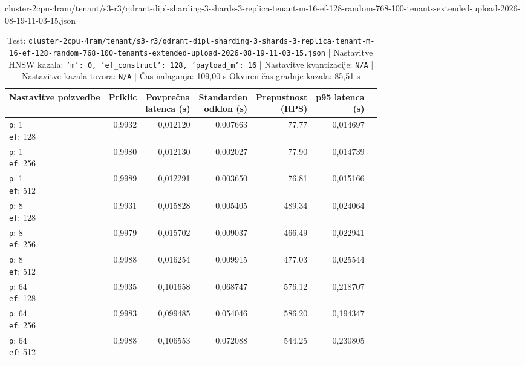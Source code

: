 \begin{table}[htbp]
  \centering
\small
  \caption{cluster-2cpu-4ram/tenant/s3-r3/qdrant-dipl-sharding-3-shards-3-replica-tenant-m-16-ef-128-random-768-100-tenants-extended-upload-2026-08-19-11-03-15.json}
  \label{tab:cluster-2cpu-4ram:tenant:s3-r3:qdrant-dipl-sharding-3-shards-3-replica-tenant-m-16-ef-128-random-768-100-tenants-extended-upload-2026-08-19-11-03-15.json}
  \begin{tabularx}{\textwidth}{Xrrrrrr}
    \toprule
    Nastavitve poizvedbe & Priklic & \makecell{Povprečna\\latenca (s)} & \makecell{Standarden\\odklon (s)} & \makecell{Prepustnost\\(RPS)} & \makecell{p95 latenca\\(s)}  \\
    \midrule
    \makecell{\texttt{p}: 1\\\texttt{ef}: 128} & 0,9932 & 0,012120 & 0,007663 & 77,77 & 0,014697 \\
    \makecell{\texttt{p}: 1\\\texttt{ef}: 256} & 0,9980 & 0,012130 & 0,002027 & 77,90 & 0,014739 \\
    \makecell{\texttt{p}: 1\\\texttt{ef}: 512} & 0,9989 & 0,012291 & 0,003650 & 76,81 & 0,015166 \\
    \makecell{\texttt{p}: 8\\\texttt{ef}: 128} & 0,9931 & 0,015828 & 0,005405 & 489,34 & 0,024064 \\
    \makecell{\texttt{p}: 8\\\texttt{ef}: 256} & 0,9979 & 0,015702 & 0,009037 & 466,49 & 0,022941 \\
    \makecell{\texttt{p}: 8\\\texttt{ef}: 512} & 0,9988 & 0,016254 & 0,009915 & 477,03 & 0,025544 \\
    \makecell{\texttt{p}: 64\\\texttt{ef}: 128} & 0,9935 & 0,101658 & 0,068747 & 576,12 & 0,218707 \\
    \makecell{\texttt{p}: 64\\\texttt{ef}: 256} & 0,9983 & 0,099485 & 0,054046 & 586,20 & 0,194347 \\
    \makecell{\texttt{p}: 64\\\texttt{ef}: 512} & 0,9988 & 0,106553 & 0,072088 & 544,25 & 0,230805 \\
    \bottomrule
  \end{tabularx}
\caption* {Test: \texttt{cluster-2cpu-4ram/tenant/s3-r3/qdrant-dipl-sharding-3-shards-3-replica-tenant-m-16-ef-128-random-768-100-tenants-extended-upload-2026-08-19-11-03-15.json} | Nastavitve HNSW kazala: \texttt{{'m': 0, 'ef\_construct': 128, 'payload\_m': 16}} | Nastavitve kvantizacije: \texttt{N/A} | Nastavitve kazala tovora: \texttt{N/A} | Čas nalaganja: 109,00 s Okviren čas gradnje kazala: 85,51 s}\end{table}

